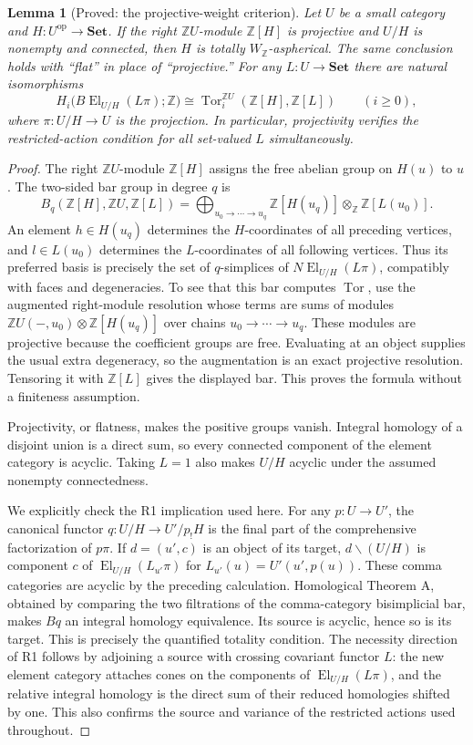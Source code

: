\documentclass[11pt,a4paper]{article}
\newtheorem{lemma}[theorem]{Lemma}
\theoremstyle{definition}
\theoremstyle{remark}
\newcommand{\Set}{\mathbf{Set}}
\newcommand{\Z}{\mathbb Z}
\newcommand{\op}{\mathrm{op}}
\newcommand{\WZ}{W_{\mathbb Z}}
\newcommand{\El}{\operatorname{El}}
\newcommand{\Tor}{\operatorname{Tor}}
\begin{document}
\begin{lemma}[Proved: the projective-weight criterion]\label{A:projective}
Let $U$ be a small category and $H:U^{\op}\to\Set$. If the right $\Z U$-module $\Z[H]$ is projective and $U/H$ is nonempty and connected, then $H$ is totally $\WZ$-aspherical. The same conclusion holds with ``flat'' in place of ``projective.'' For any $L:U\to\Set$ there are natural isomorphisms
\[
 H_i\bigl(B\El_{U/H}(L\pi);\Z\bigr)
 \cong \Tor_i^{\Z U}(\Z[H],\Z[L])\qquad(i\geq0),
\]
where $\pi:U/H\to U$ is the projection. In particular, projectivity verifies the restricted-action condition for all set-valued $L$ simultaneously.
\end{lemma}
\begin{proof}
The right $\Z U$-module $\Z[H]$ assigns the free abelian group on $H(u)$ to $u$. The two-sided bar group in degree $q$ is
\[
 B_q(\Z[H],\Z U,\Z[L])=
 \bigoplus_{u_0\to\cdots\to u_q}\Z[H(u_q)]\otimes_{\Z}\Z[L(u_0)].
\]
An element $h\in H(u_q)$ determines the $H$-coordinates of all preceding vertices, and $l\in L(u_0)$ determines the $L$-coordinates of all following vertices. Thus its preferred basis is precisely the set of $q$-simplices of $N\El_{U/H}(L\pi)$, compatibly with faces and degeneracies. To see that this bar computes $\Tor$, use the augmented right-module resolution whose terms are sums of modules $\Z U(-,u_0)\otimes\Z[H(u_q)]$ over chains $u_0\to\cdots\to u_q$. These modules are projective because the coefficient groups are free. Evaluating at an object supplies the usual extra degeneracy, so the augmentation is an exact projective resolution. Tensoring it with $\Z[L]$ gives the displayed bar. This proves the formula without a finiteness assumption.

Projectivity, or flatness, makes the positive groups vanish. Integral homology of a disjoint union is a direct sum, so every connected component of the element category is acyclic. Taking $L=1$ also makes $U/H$ acyclic under the assumed nonempty connectedness.

We explicitly check the R1 implication used here. For any $p:U\to U'$, the canonical functor $q:U/H\to U'/p_!H$ is the final part of the comprehensive factorization of $p\pi$. If $d=(u',c)$ is an object of its target, $d\backslash(U/H)$ is component $c$ of $\El_{U/H}(L_{u'}\pi)$ for $L_{u'}(u)=U'(u',p(u))$. These comma categories are acyclic by the preceding calculation. Homological Theorem A, obtained by comparing the two filtrations of the comma-category bisimplicial bar, makes $Bq$ an integral homology equivalence. Its source is acyclic, hence so is its target. This is precisely the quantified totality condition. The necessity direction of R1 follows by adjoining a source with crossing covariant functor $L$: the new element category attaches cones on the components of $\El_{U/H}(L\pi)$, and the relative integral homology is the direct sum of their reduced homologies shifted by one. This also confirms the source and variance of the restricted actions used throughout.
\end{proof}
\end{document}
